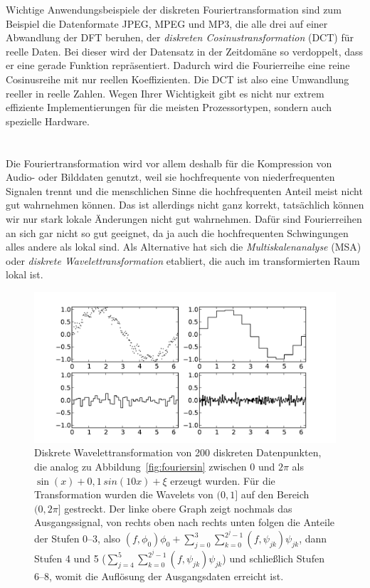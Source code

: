 Wichtige Anwendungsbeispiele der diskreten Fouriertransformation sind
zum Beispiel die Datenformate JPEG, MPEG und MP3, die alle drei auf
einer Abwandlung der DFT beruhen, der \emph{diskreten
  Cosinustransformation} (DCT) für reelle Daten. Bei dieser wird der
Datensatz in der Zeitdomäne so verdoppelt, dass er eine gerade
Funktion repräsentiert. Dadurch wird die Fourierreihe eine reine
Cosinusreihe mit nur reellen Koeffizienten. Die DCT ist also eine
Umwandlung reeller in reelle Zahlen. Wegen Ihrer Wichtigkeit gibt es
nicht nur extrem effiziente Implementierungen für die meisten
Prozessortypen, sondern auch spezielle Hardware.

\section{}

Die Fouriertransformation wird vor allem deshalb für die Kompression
von Audio- oder Bilddaten genutzt, weil sie hochfrequente von
niederfrequenten Signalen trennt und die menschlichen Sinne die
hochfrequenten Anteil meist nicht gut wahrnehmen können. Das ist
allerdings nicht ganz korrekt, tatsächlich können wir nur stark lokale
Änderungen nicht gut wahrnehmen. Dafür sind Fourierreihen an sich gar
nicht so gut geeignet, da ja auch die hochfrequenten Schwingungen
alles andere als lokal sind. Als Alternative hat sich die
\emph{Multiskalenanalyse} (MSA) oder \emph{diskrete
  Wavelettransformation} etabliert, die auch im transformierten Raum
lokal ist.

\begin{figure}
  \centering
  \includegraphics[width=\textwidth]{plots/wavelet}
  \caption{Diskrete Wavelettransformation von 200 diskreten
    Datenpunkten, die analog zu Abbildung~\ref{fig:fouriersin} zwischen
    0 und $2\pi$ als $\sin(x) + 0,1\,sin(10 x) + \xi$ erzeugt
    wurden. Für die Transformation wurden die Wavelets von $(0,1]$ auf
    den Bereich $(0,2\pi]$ gestreckt. Der linke obere Graph zeigt
    nochmals das Ausgangssignal, von rechts oben nach rechts unten
    folgen die Anteile der Stufen 0--3, also $(f,\phi_0)\phi_0 +
    \sum_{j=0}^{3} \sum_{k=0}^{2^j-1} (f,\psi_{jk})\psi_{jk}$, dann
    Stufen 4 und 5 ($\sum_{j=4}^{5} \sum_{k=0}^{2^j-1}
    (f,\psi_{jk})\psi_{jk}$) und schließlich Stufen 6--8, womit die
    Auflösung der Ausgangsdaten erreicht ist.}
  \label{fig:dwt}
\end{figure}

